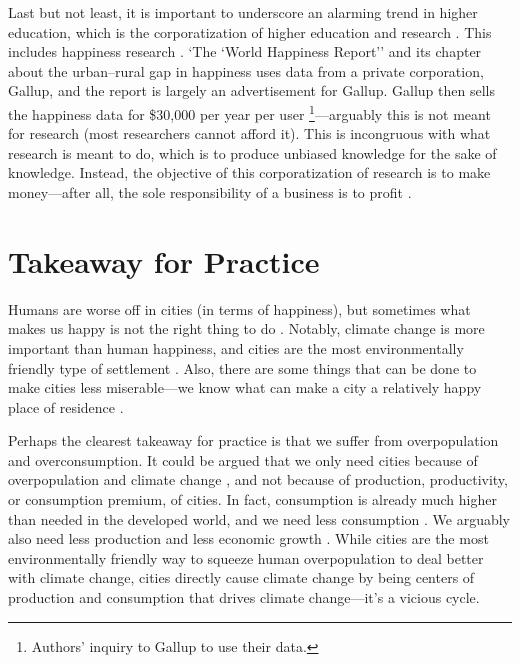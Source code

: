 \documentclass[10pt, letterpaper]{article}
\begin{document}
Last but not least, it is important to underscore an alarming trend in higher
education, which is the corporatization of higher education and research
\citep{mills2012corporatization,cox2013corporatization,millsNYT12fa,CatropaNYT20feb8,schmidlinNYT15oct10}. This
includes happiness research \citep{davies15}. `The `World Happiness Report''
\citep{helliwell20} and its chapter about the urban--rural gap in happiness
\citep{burger20} uses data from a private corporation, Gallup, and the report %
 is largely an advertisement for Gallup. Gallup then sells the happiness data
 for \$30,000 per year per user \footnote{Authors' inquiry to Gallup to use
   their data.}---arguably this is not meant for research (most researchers
 cannot afford it). This is incongruous with what research is meant to do, which
 is to produce unbiased knowledge for the sake of knowledge. Instead, the
 objective of this corporatization of research is to make money---after all, the sole responsibility of a business is to profit \citep{friedman70}.

\section*{Takeaway for Practice}
Humans are worse off in cities (in terms of happiness), but sometimes what
makes us happy is not the right thing to do \citep{linden11,haybron08,nussbaum05}. Notably,
climate change is more important than human happiness, and cities are the most
environmentally friendly type of settlement \citep{meyer13}. Also, there are
some things that can be done to make cities less miserable---we know what can
make a city a relatively happy place of residence  \citep[see][]{ballas13}.

Perhaps the clearest takeaway for practice is that we suffer from overpopulation
and overconsumption. It could be argued that we only need cities because of
overpopulation and climate change \citep{pachauri14}, and not because of
production, productivity, or consumption premium, of cities. In fact,
consumption is already much higher than needed in the developed world, and we need less consumption
\citep{dittmar14,kasser13,leonard10}. We arguably also need less production and less economic growth \citep{kallis12,kallis11,bergh11}. While cities are the most environmentally friendly way to squeeze human overpopulation %
to deal better with climate change, cities directly cause climate change by being centers of production and consumption that drives climate change---it's a vicious cycle.  
\end{document}
